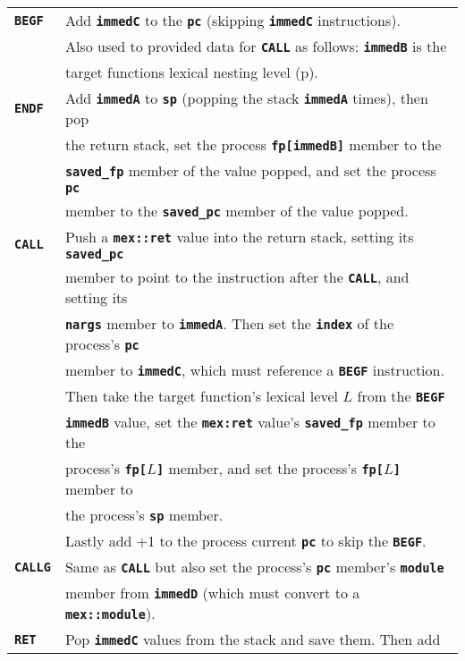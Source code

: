 \documentclass[12pt]{article}
\newcommand{\TT}[1]{{\tt \bfseries #1}}
\newcommand{\pagref}[1]{p\pageref{#1}}
\newlength{\figurewidth}
\newenvironment{boxedfigure}[1][!btp]%
	{\begin{figure*}[#1]
	 \begin{lrbox}{\figurebox}
	 \begin{minipage}{\figurewidth}

	 \vspace*{1ex}}%
	{
	 \vspace*{1ex}

	 \end{minipage}
	 \end{lrbox}

	 \centering
	 \fbox{\hspace*{0.1in}\usebox{\figurebox}\hspace*{0.1in}}
	 \end{figure*}}
\begin{document}
\begin{boxedfigure}

\begin{center}
\begin{tabular}{|l|l|}
\hline
\TT{BEGF}
    & Add \TT{immedC} to the \TT{pc} (skipping \TT{immedC} instructions).
    \\[0.5ex]
    & Also used to provided data for \TT{CALL} as follows: \TT{immedB} is the \\
    & target functions lexical nesting level (\pagref{LEXICAL-NESTING-LEVEL}).
\\\hline
\TT{ENDF}
    & Add \TT{immedA} to \TT{sp} (popping the stack \TT{immedA} times),
    					then pop \\
    & the return stack, set the process \TT{fp[immedB]} member to the \\
    & \TT{saved\_fp} member of the value popped, and set the process \TT{pc} \\
    & member to the \TT{saved\_pc} member of the value popped.
\\\hline
\TT{CALL}
    & Push a \TT{mex::ret} value into the return stack, setting its
      \TT{saved\_pc} \\
    & member to point to the instruction after the \TT{CALL},
      and setting its \\
    & \TT{nargs} member to \TT{immedA}.  Then set
      the \TT{index} of the process's \TT{pc} \\
    & member to \TT{immedC}, which must reference a \TT{BEGF} instruction.
    \\[0.5ex]
    & Then take the target function's lexical level $L$ from the \TT{BEGF} \\
    & \TT{immedB} value, set the \TT{mex:ret} value's \TT{saved\_fp} member
      to the \\
    & process's \TT{fp[$L$]} member, and set the process's \TT{fp[$L$]}
      member to \\
    & the process's \TT{sp} member.
    \\[0.5ex]
    & Lastly add +1 to the process current \TT{pc} to skip the \TT{BEGF}.
\\\hline
\TT{CALLG}
    & Same as \TT{CALL} but also set the process's \TT{pc} member's 
                                                           \TT{module} \\
    & member from \TT{immedD} (which must convert to a \TT{mex::module}).
\\\hline
\TT{RET}
    & Pop \TT{immedC} values from the stack and save them.  Then add \\

\end{tabular}
\end{center}
\end{boxedfigure}
\end{document}

